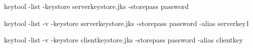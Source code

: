 \begin{DoxyItemize}
\item keytool -\/list -\/keystore serverkeystore.\+jks -\/storepass password 
\item keytool -\/list -\/v -\/keystore serverkeystore.\+jks -\/storepass password -\/alias serverkey1 
\item keytool -\/list -\/v -\/keystore clientkeystore.\+jks -\/storepass password -\/alias clientkey 
\begin{DoxyItemize}
\item 
\end{DoxyItemize}
\end{DoxyItemize}
